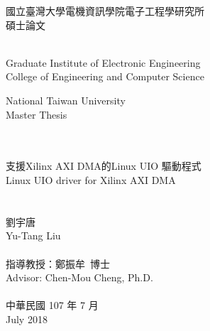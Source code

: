 \begin{titlepage}
  \begin{center}

    {\fontsize{18}{27}\selectfont
    國立臺灣大學電機資訊學院電子工程學研究所\\
    碩士論文\\
    }

    \small{~}\\

    {\fontsize{14}{21}\selectfont
    Graduate Institute of Electronic Engineering\\
    College of Engineering and Computer Science\\
    }

    {\fontsize{16}{24}\selectfont
    National Taiwan University\\
    Master Thesis\\
    }

    {\fontsize{18}{27}\selectfont
    ~\\
    ~\\

    支援Xilinx AXI DMA的Linux UIO 驅動程式\\
    Linux UIO driver for Xilinx AXI DMA\\

    ~\\
    ~\\

    劉宇唐\\
    Yu-Tang Liu\\

    ~\\

    指導教授：鄭振牟~博士\\
    Advisor: Chen-Mou Cheng, Ph.D.\\

    ~\\

    中華民國 107 年 7 月\\
    July 2018\\
    }

  \end{center}
\end{titlepage}
